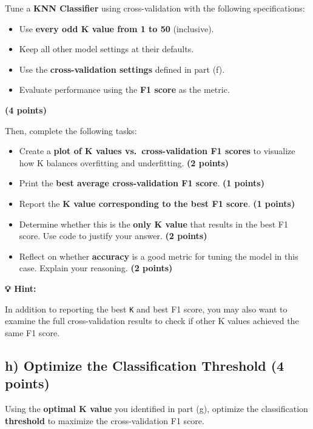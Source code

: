 \documentclass[
  letterpaper,
  DIV=11,
  numbers=noendperiod]{scrreprt}
\providecommand{\tightlist}{%
  \setlength{\itemsep}{0pt}\setlength{\parskip}{0pt}}\usepackage{longtable,booktabs,array}
\begin{document}
Tune a \textbf{KNN Classifier} using cross-validation with the following
specifications:

\begin{itemize}
\tightlist
\item
  Use \textbf{every odd K value from 1 to 50} (inclusive).
\item
  Keep all other model settings at their defaults.
\item
  Use the \textbf{cross-validation settings} defined in part (f).
\item
  Evaluate performance using the \textbf{F1 score} as the metric.
\end{itemize}

\textbf{(4 points)}

Then, complete the following tasks:

\begin{itemize}
\tightlist
\item
  Create a \textbf{plot of K values vs.~cross-validation F1 scores} to
  visualize how K balances overfitting and underfitting. \textbf{(2
  points)}
\item
  Print the \textbf{best average cross-validation F1 score}. \textbf{(1
  points)}
\item
  Report the \textbf{K value corresponding to the best F1 score}.
  \textbf{(1 points)}
\item
  Determine whether this is the \textbf{only K value} that results in
  the best F1 score. Use code to justify your answer. \textbf{(2
  points)}
\item
  Reflect on whether \textbf{accuracy} is a good metric for tuning the
  model in this case. Explain your reasoning. \textbf{(2 points)}
\end{itemize}

\textbf{💡 Hint:}

In addition to reporting the best \texttt{K} and best F1 score, you may
also want to examine the full cross-validation results to check if other
K values achieved the same F1 score.

\subsection{\texorpdfstring{h) Optimize the Classification Threshold
\textbf{(4
points)}}{h) Optimize the Classification Threshold (4 points)}}\label{h-optimize-the-classification-threshold-4-points}

Using the \textbf{optimal K value} you identified in part (g), optimize
the classification \textbf{threshold} to maximize the cross-validation
F1 score.
\end{document}
